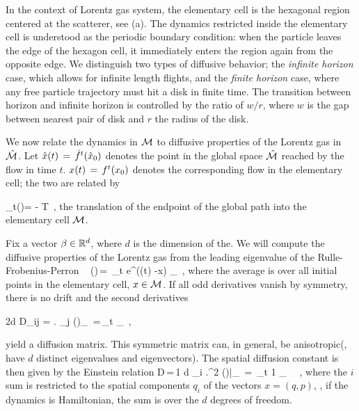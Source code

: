 \documentclass[aps,pre,
                showpacs,
                twocolumn,
                groupedaddress,
                floatfix]{revtex4-1}
\begin{document}
In the context of Lorentz gas system, the elementary cell is the hexagonal region centered at the scatterer, see  (a). The dynamics restricted inside the elementary cell is understood as the periodic boundary condition: when the particle leaves the edge of the hexagon cell, it immediately enters the region again from the opposite edge. We distinguish two types of diffusive behavior; the {\em infinite horizon} case, which allows for infinite length flights, and the {\em finite horizon} case, where any free particle trajectory must hit a disk in finite time. The transition between horizon and infinite horizon is controlled by the ratio of $w/r$, where $w$ is the gap between nearest pair of disk and $r$ the radius of the disk.

We now relate the dynamics in ${\cal M}$ to diffusive properties of the Lorentz gas in $\hat {{\cal M}}$. Let $\hat x(t)\,=\,{\hat{f}^{t}(\hat x_0)}$ denotes the point in the global space $\hat {{\cal M}}$ reached by the flow in time $t$. $x(t)\,=\,{f^{t}({x_0})}$ denotes the corresponding flow in the elementary cell; the two are related by

\beq
\hn_t(\xInit)= -  \in T \,,
the translation of the endpoint of the global path into the elementary cell $\pS$.

Fix a vector $\beta \in \reals^d$, where $d$ is the dimension of the{\statesp}. We will compute the diffusive properties of the Lorentz gas from the leading eigenvalue of the Rulle-Frobenius-Perron \evOper\
\beq
\eigenvL(\beta)\,=\, \lim_{t \rightarrow \infty}  \log \langle
e^{\beta \cdot (\hx(t) -x) } \rangle_\pS ~, \quad
\label{eq-diff-1}
\eeq
where the average is over all initial points in the elementary cell, $x \in{\cal M}$. If all odd derivatives vanish by symmetry, there is no drift and the second derivatives
\begin{widetext}
\beq
2d D_{ij} = \left . {} {\frac{\partial} 
{\partial \beta_j}} \eigenvL(\beta)\right\vert_{\beta=0} \,=\,\lim_{t\rightarrow
\infty} {\frac{1}{t}} \langle {(\hx(t) -x)_i (\hx(t) -x)_j } \rangle_\pS ~,
\eeq
\end{widetext}
yield a diffusion matrix.  This symmetric matrix can, in general, be anisotropic(\ie, have $d$ distinct eigenvalues and eigen\-vectors). The spatial diffusion constant is then given by the Einstein relation
\beq
D\,=\,{1 d} \sum_i \left .{{\partial}^2 } \eigenvL(\beta)\right |_{} \,=\,
\lim_{t\rightarrow \infty} {1} 
\rangle_\pS~ ~,
\eeq
where the $i$ sum is restricted to the spatial components $q_i$ of the{\statesp} vectors $x=(q,p)$, \ie, if the dynamics is Hamiltonian, the sum is over the $d$ degrees of freedom.
\end{document}
